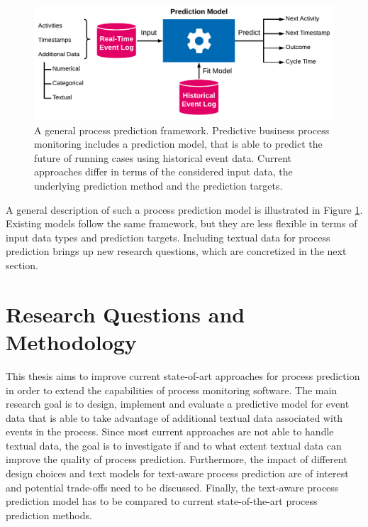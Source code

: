\begin{figure}[htbp!]
	\centering
	\includegraphics[width=\textwidth]{figures/problem-description}
	\caption[A general process prediction framework]{A general process prediction framework. Predictive business process monitoring includes a prediction model, that is able to predict the future of running cases using historical event data. Current approaches differ in terms of the considered input data, the underlying prediction method and the prediction targets.}
	\label{fig:/problem-description}
\end{figure}

A general description of such a process prediction model is illustrated in Figure \ref{fig:/problem-description}.
Existing models follow the same framework, but they are less flexible in terms of input data types and prediction targets.
Including textual data for process prediction brings up new research questions, which are concretized in the next section.

\section{Research Questions and Methodology}\label{sec:methodology}

This thesis aims to improve current state-of-art approaches for process prediction in order to extend the capabilities of process monitoring software.
The main research goal is to design, implement and evaluate a predictive model for event data that is able to take advantage of additional textual data associated with events in the process.
Since most current approaches are not able to handle textual data, the goal is to investigate if and to what extent textual data can improve the quality of process prediction.
Furthermore, the impact of different design choices and text models for text-aware process prediction are of interest and potential trade-offs need to be discussed.
Finally, the text-aware process prediction model has to be compared to current state-of-the-art process prediction methods.

